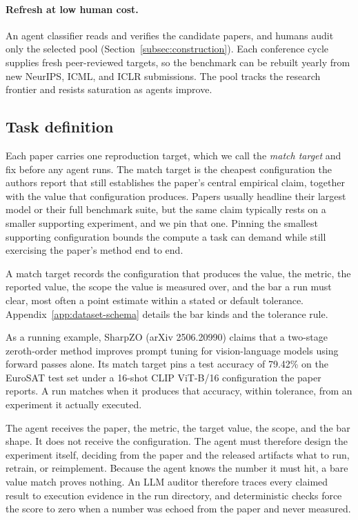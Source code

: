 \documentclass{article} %
\begin{document}
\paragraph{Refresh at low human cost.} An agent classifier reads and
verifies the candidate papers, and humans audit only the selected pool
(Section~\ref{subsec:construction}). Each conference cycle supplies fresh
peer-reviewed targets, so the benchmark can be rebuilt yearly from new
NeurIPS, ICML, and ICLR submissions. The pool tracks the research frontier
and resists saturation as agents improve.

\subsection{Task definition}
\label{subsec:task}

Each paper carries one reproduction target, which we call the \emph{match
target} and fix before any agent runs. The match target is the cheapest
configuration the authors report that still establishes the paper's central
empirical claim, together with the value that configuration produces. Papers
usually headline their largest model or their full benchmark suite, but the
same claim typically rests on a smaller supporting experiment, and we pin that
one. Pinning the smallest supporting configuration bounds the compute a task
can demand while still exercising the paper's method end to end.

A match target records the configuration that produces the value, the metric,
the reported value, the scope the value is measured over, and the bar a run
must clear, most often a point estimate within a stated or default tolerance.
Appendix~\ref{app:dataset-schema} details the bar kinds and the tolerance
rule.

As a running example, SharpZO (arXiv 2506.20990) claims that a two-stage
zeroth-order method improves prompt tuning for vision-language models using
forward passes alone. Its match target pins a test accuracy of 79.42\% on the
EuroSAT test set under a 16-shot CLIP ViT-B/16 configuration the paper
reports. A run matches when it produces that accuracy, within tolerance, from
an experiment it actually executed.

The agent receives the paper, the metric, the target value, the scope, and
the bar shape. It does not receive the configuration. The agent must
therefore design the experiment itself, deciding from the paper and the
released artifacts what to run, retrain, or reimplement. Because the agent
knows the number it must hit, a bare value match proves nothing. An LLM
auditor therefore traces every claimed result to execution
evidence in the run directory, and deterministic checks force the score to
zero when a number was echoed from the paper and never measured.
\end{document}
